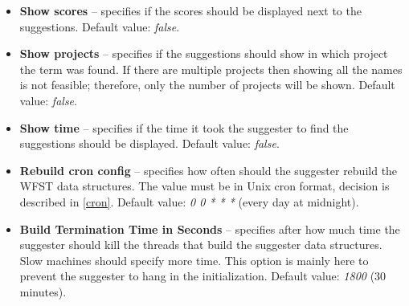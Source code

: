 \begin{itemize}
    \item \textbf{Show scores} – specifies if the scores should be displayed next to the suggestions.
    Default value: \textit{false}.
    \item \textbf{Show projects} – specifies if the suggestions should show in which project the term was found.
    If there are multiple projects then showing all the names is not feasible; therefore, only the number of projects will be shown.
    Default value: \textit{false}.
    \item \textbf{Show time} – specifies if the time it took the suggester to find the suggestions should be displayed.
    Default value: \textit{false}.
    \item \textbf{Rebuild cron config} – specifies how often should the suggester rebuild the WFST data structures.
    The value must be in Unix cron format, decision is described in \ref{cron}.  Default value: \textit{0 0 * * *} (every day at midnight).
    \item \textbf{Build Termination Time in Seconds} – specifies after how much time the suggester should kill the
    threads that build the suggester data structures. Slow machines should specify more time. This option is mainly here
    to prevent the suggester to hang in the initialization. Default value: \textit{1800} (30 minutes).
\end{itemize}
